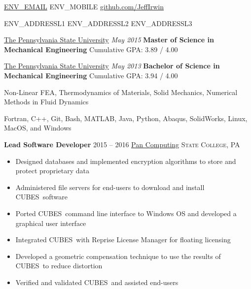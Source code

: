\documentclass[10.5pt,letterpaper]{article}
\begin{document}
\sloppy  %


\nobreakvspace{0.3em}  %


\noindent
\href{mailto:ENV\_EMAIL}{ENV\_EMAIL}\sbull
ENV\_MOBILE\sbull
\href{https://github.com/JeffIrwin}{github.com/JeffIrwin}

\noindent
ENV\_ADDRESSL1\sbull
ENV\_ADDRESSL2\sbull
ENV\_ADDRESSL3

\spacedhrule{1.0em}{-0.5em}  %

\noindent \href{https://www.psu.edu/}{The Pennsylvania State University} \hfill \emph{May 2015} \break
\textbf{Master of Science in Mechanical Engineering} \hfill Cumulative GPA:  3.89 / 4.00

\vspace{1em}
\noindent \href{https://www.psu.edu/}{The Pennsylvania State University} \hfill \emph{May 2013} \break
\textbf{Bachelor of Science in Mechanical Engineering} \hfill Cumulative GPA:  3.94 / 4.00

Non-Linear FEA, Thermodynamics of Materials, Solid Mechanics, Numerical Methods in Fluid Dynamics

Fortran, C++, Git, Bash, MATLAB, Java, Python, Abaqus, SolidWorks, Linux, MacOS, and Windows

\spacedhrule{0.5em}{-0.5em}

\noindent \textbf{Lead Software Developer} \hfill 2015 -- 2016 \break
\href{http://www.pancomputing.com}{Pan Computing} \hfill \textsc{State College, PA}
\begin{itemize}
	\setlength{\parskip}{0em}
	\item Designed databases and implemented encryption algorithms to store and protect proprietary data
	\item Administered file servers for end-users to download and install CUBES\textsuperscript\textregistered\ software
	\item Ported CUBES\textsuperscript\textregistered\ command line interface to Windows OS and developed a graphical user interface
	\item Integrated CUBES\textsuperscript\textregistered\ with Reprise License Manager for floating licensing
	\item Developed a geometric compensation technique to use the results of CUBES\textsuperscript\textregistered\ to reduce distortion
	\item Verified and validated CUBES\textsuperscript\textregistered\ and assisted end-users
\end{itemize}
\end{document}
